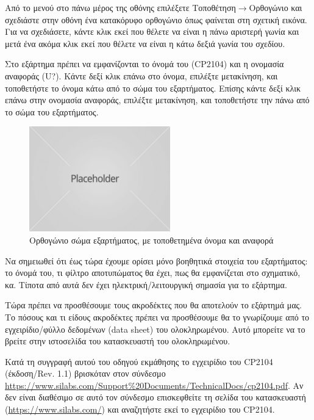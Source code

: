 \documentclass[a4paper]{article}
\begin{document}
Από το μενού στο πάνω μέρος της οθόνης επιλέξετε Τοποθέτηση$\rightarrow$Ορθογώνιο και σχεδιάστε στην οθόνη ένα κατακόρυφο ορθογώνιο όπως φαίνεται στη σχετική εικόνα. Για να σχεδιάσετε, κάντε κλικ εκεί που θέλετε να είναι η πάνω αριστερή γωνία και μετά ένα ακόμα κλικ εκεί που θέλετε να είναι η κάτω δεξιά γωνία του σχεδίου.

Στο εξάρτημα πρέπει να εμφανίζονται το όνομά του (CP2104) και η ονομασία αναφοράς (U?). Κάντε δεξί κλικ επάνω στο όνομα, επιλέξτε μετακίνηση, και τοποθετήστε το όνομα κάτω από το σώμα του εξαρτήματος. Επίσης κάντε δεξί κλικ επάνω στην ονομασία αναφοράς, επιλέξτε μετακίνηση, και τοποθετήστε την πάνω από το σώμα του εξαρτήματος. 

\begin{figure}
  \begin{center}
    \includegraphics{img/kicad-main.png}
    \caption{Ορθογώνιο σώμα εξαρτήματος, με τοποθετημένα όνομα και αναφορά}
    \label{fig:kicad-main}
  \end{center}
\end{figure}

Να σημειωθεί ότι έως τώρα έχουμε ορίσει μόνο βοηθητικά στοιχεία του εξαρτήματος: το όνομά του, τι φίλτρο αποτυπώματος θα έχει, πως θα εμφανίζεται στο σχηματικό, κα. Τίποτα από αυτά δεν έχει ηλεκτρική/λειτουργική σημασία για το εξάρτημα.

Τώρα πρέπει να προσθέσουμε τους ακροδέκτες που θα αποτελούν το εξάρτημά μας. Το πόσους και τι είδους ακροδέκτες πρέπει να προσθέσουμε θα το γνωρίζουμε από το εγχειρίδιο/φύλλο δεδομένων (data sheet) του ολοκληρωμένου. Αυτό μπορείτε να το βρείτε στην ιστοσελίδα του κατασκευαστή του ολοκληρωμένου. 

Κατά τη συγγραφή αυτού του οδηγού εκμάθησης το εγχειρίδιο του CP2104 (έκδοση/Rev. 1.1) βρισκόταν στον σύνδεσμο \href{https://www.silabs.com/Support\%20Documents/TechnicalDocs/cp2104.pdf}{https://www.silabs.com/Support\%20Documents/TechnicalDocs/cp2104.pdf}. Αν δεν είναι διαθέσιμο σε αυτό τον σύνδεσμο επισκεφθείτε τη σελίδα του κατασκευαστή (\href{https://www.silabs.com/}{https://www.silabs.com/}) και αναζητήστε εκεί το εγχειρίδιο του CP2104.
\end{document}
